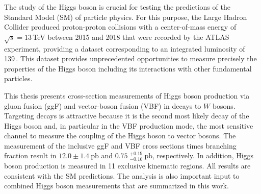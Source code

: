 The study of the Higgs boson is crucial for testing the predictions of the Standard Model (SM) of particle physics. 
For this purpose, the Large Hadron Collider produced proton-proton collisions with a center-of-mass energy of $\sqrt{s} = 13\,$TeV between 2015 and 2018 that were recorded by the ATLAS experiment, providing a dataset corresponding to an integrated luminosity of 139\,\ifb.
This dataset provides unprecedented opportunities to measure precisely the properties of the Higgs boson including its interactions with other fundamental particles.


This thesis presents cross-section measurements of Higgs boson production via gluon fusion (ggF) and vector-boson fusion (VBF) in decays to $W$ bosons.
Targeting \HWW decays is attractive because it is the second most likely decay of the Higgs boson and, in particular in the VBF production mode, the most sensitive channel to measure the coupling of the Higgs boson to vector bosons.
The measurement of the inclusive ggF and VBF cross sections times branching fraction result in $12.0 \pm 1.4~\mathrm{pb}$ and $0.75\;^{+0.19}_{-0.16}~\mathrm{pb}$, respectively.
In addition, Higgs boson production is measured in 11 exclusive kinematic regions. All results are consistent with the SM predictions.
The analysis is also important input to combined Higgs boson measurements that are summarized in this work. 

